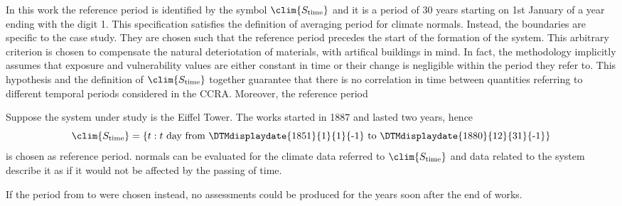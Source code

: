 In this work the reference period is identified by the symbol $\clim{S_\text{time}}$ and it is a period of 30 years starting on 1st January of a year ending with the digit 1. This specification satisfies the definition of averaging period for climate \glspl{normal}.
Instead, the boundaries are specific to the case study. They are chosen such that the reference period precedes the start of the formation of the system. This arbitrary criterion is chosen to compensate the natural deteriotation of materials, with artifical buildings in mind. In fact, the methodology implicitly assumes that exposure and vulnerability values are either constant in time or their change is negligible within the period they refer to. This hypothesis and the definition of $\clim{S_\text{time}}$ together guarantee that there is no correlation in time between quantities referring to different temporal periods considered in the \gls{CCRA}. Moreover, the reference period 
\begin{example}
  Suppose the system under study is the Eiffel Tower. The works started in 1887 and lasted two years, hence
  \begin{equation*}
    \clim{S_\text{time}} = \{ t : \text{$t$ day from \DTMdisplaydate{1851}{1}{1}{-1} to \DTMdisplaydate{1880}{12}{31}{-1}} \}
  \end{equation*}
  is chosen as reference period. \Glspl{normal} can be evaluated for the climate data referred to $\clim{S_\text{time}}$ and data related to the system describe it as if it would not be affected by the passing of time.
  
  If the period from  to  were chosen instead, no assessments could be produced for the years soon after the end of works.
\end{example}

